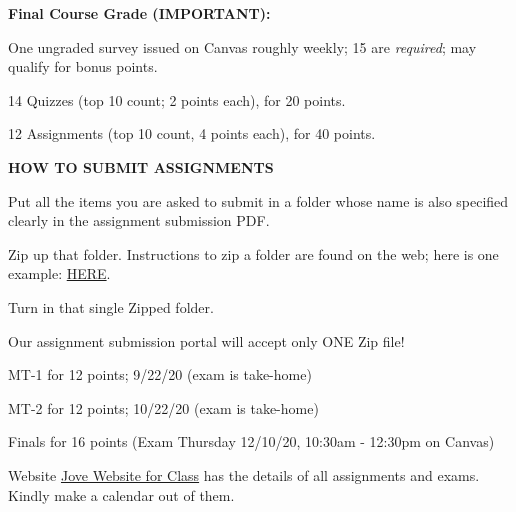 \documentclass[12pt]{article}
\newcommand{\para}[1]{{\vspace{4pt}\noindent\bf{#1:}}}
\begin{document}
\para{Final Course Grade (IMPORTANT)}
\begin{compactitem}
%     
%     

\item One ungraded survey issued on Canvas roughly weekly; 15 are {\em required};
  may qualify for bonus points.
\item 14 Quizzes (top 10 count; 2 points each), for 20 points.
\item 12 Assignments (top 10 count, 4 points each), for 40 points.
\item[]
\item[] {\bf HOW TO SUBMIT ASSIGNMENTS}
  \begin{compactitem}
  \item Put all the items you are asked to submit in a folder whose
    name is also specified clearly in the assignment submission PDF.
  \item Zip up that folder. Instructions to zip a folder
    are found on the web; here is
    one example:
    \href{https://www.hellotech.com/guide/for/how-to-zip-a-file-mac-windows-pc}{HERE}.
  \item Turn in that single Zipped folder.
  \item Our assignment submission portal will accept only ONE Zip file!
  \end{compactitem}
\item[]  
\item MT-1 for 12 points; 9/22/20 (exam is take-home)
\item MT-2 for 12 points; 10/22/20 (exam is take-home)
\item Finals for 16 points (Exam Thursday 12/10/20, 10:30am - 12:30pm on Canvas)
\end{compactitem}
\noindent Website
\href{https://github.com/ganeshutah/Jove/tree/master/For_CS3100_Fall2020}{Jove Website for Class}
has the details of all assignments and exams. Kindly make a calendar out of them.
\end{document}
